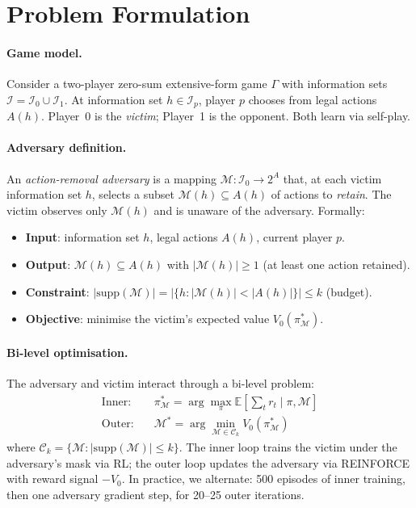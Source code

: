 \documentclass{article}
\begin{document}
\section{Problem Formulation}

\paragraph{Game model.}
Consider a two-player zero-sum extensive-form game $\Gamma$ with information sets $\mathcal{I} = \mathcal{I}_0 \cup \mathcal{I}_1$. At information set $h \in \mathcal{I}_p$, player $p$ chooses from legal actions $A(h)$. Player~0 is the \emph{victim}; Player~1 is the opponent. Both learn via self-play.

\paragraph{Adversary definition.}
An \emph{action-removal adversary} is a mapping $\mathcal{M}: \mathcal{I}_0 \to 2^A$ that, at each victim information set $h$, selects a subset $\mathcal{M}(h) \subseteq A(h)$ of actions to \emph{retain}. The victim observes only $\mathcal{M}(h)$ and is unaware of the adversary. Formally:

\begin{itemize}
\item \textbf{Input}: information set $h$, legal actions $A(h)$, current player $p$.
\item \textbf{Output}: $\mathcal{M}(h) \subseteq A(h)$ with $|\mathcal{M}(h)| \geq 1$ (at least one action retained).
\item \textbf{Constraint}: $|\text{supp}(\mathcal{M})| = |\{h : |\mathcal{M}(h)| < |A(h)|\}| \leq k$ (budget).
\item \textbf{Objective}: minimise the victim's expected value $V_0(\pi^*_\mathcal{M})$.
\end{itemize}

\paragraph{Bi-level optimisation.}
The adversary and victim interact through a bi-level problem:
\begin{align}
\text{Inner:} \quad & \pi^*_\mathcal{M} = \arg\max_\pi \mathbb{E}\left[\sum_t r_t \mid \pi, \mathcal{M}\right] \label{eq:inner} \\
\text{Outer:} \quad & \mathcal{M}^* = \arg\min_{\mathcal{M} \in \mathcal{C}_k} V_0(\pi^*_\mathcal{M}) \label{eq:outer}
\end{align}
where $\mathcal{C}_k = \{\mathcal{M} : |\text{supp}(\mathcal{M})| \leq k\}$. The inner loop trains the victim under the adversary's mask via RL; the outer loop updates the adversary via REINFORCE with reward signal $-V_0$. In practice, we alternate: 500 episodes of inner training, then one adversary gradient step, for 20--25 outer iterations.
\end{document}
